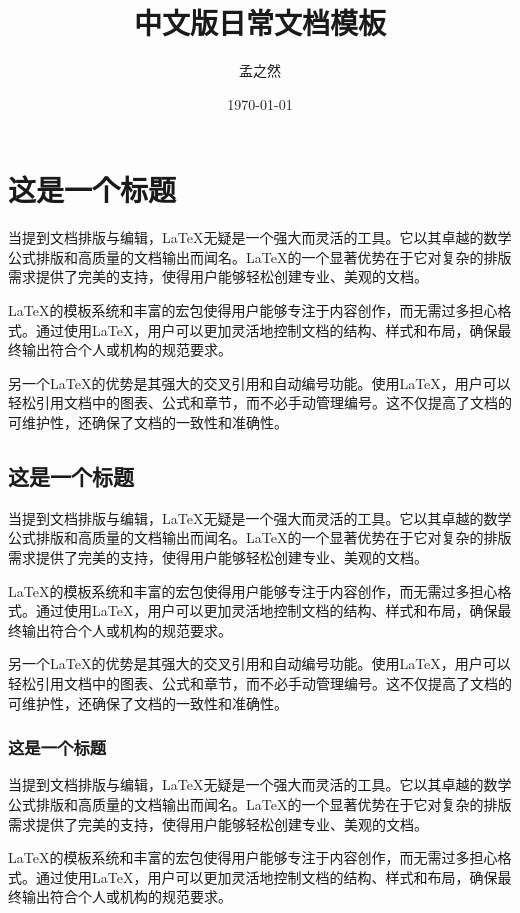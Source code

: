 \documentclass[AutoFakeBold,a4paper]{ctexart}
\title{\heiti\zihao{2}\textbf{中文版日常文档模板}}
\author{\zihao{4}孟之然}
\date{\today}
\begin{document}
\maketitle
\thispagestyle{fancy}


\section{这是一个标题}

当提到文档排版与编辑，LaTeX无疑是一个强大而灵活的工具。它以其卓越的数学公式排版和高质量的文档输出而闻名。LaTeX的一个显著优势在于它对复杂的排版需求提供了完美的支持，使得用户能够轻松创建专业、美观的文档。

LaTeX的模板系统和丰富的宏包使得用户能够专注于内容创作，而无需过多担心格式。通过使用LaTeX，用户可以更加灵活地控制文档的结构、样式和布局，确保最终输出符合个人或机构的规范要求。

另一个LaTeX的优势是其强大的交叉引用和自动编号功能。使用LaTeX，用户可以轻松引用文档中的图表、公式和章节，而不必手动管理编号。这不仅提高了文档的可维护性，还确保了文档的一致性和准确性。

\subsection{这是一个标题}

当提到文档排版与编辑，LaTeX无疑是一个强大而灵活的工具。它以其卓越的数学公式排版和高质量的文档输出而闻名。LaTeX的一个显著优势在于它对复杂的排版需求提供了完美的支持，使得用户能够轻松创建专业、美观的文档。

LaTeX的模板系统和丰富的宏包使得用户能够专注于内容创作，而无需过多担心格式。通过使用LaTeX，用户可以更加灵活地控制文档的结构、样式和布局，确保最终输出符合个人或机构的规范要求。

另一个LaTeX的优势是其强大的交叉引用和自动编号功能。使用LaTeX，用户可以轻松引用文档中的图表、公式和章节，而不必手动管理编号。这不仅提高了文档的可维护性，还确保了文档的一致性和准确性。

\subsubsection{这是一个标题}

当提到文档排版与编辑，LaTeX无疑是一个强大而灵活的工具。它以其卓越的数学公式排版和高质量的文档输出而闻名。LaTeX的一个显著优势在于它对复杂的排版需求提供了完美的支持，使得用户能够轻松创建专业、美观的文档。

LaTeX的模板系统和丰富的宏包使得用户能够专注于内容创作，而无需过多担心格式。通过使用LaTeX，用户可以更加灵活地控制文档的结构、样式和布局，确保最终输出符合个人或机构的规范要求。
\end{document}
